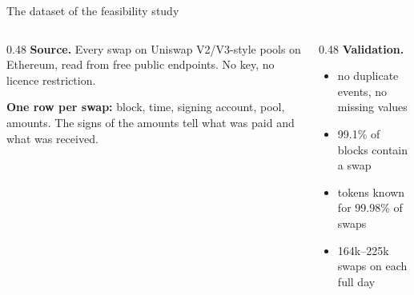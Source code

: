 \documentclass[aspectratio=169,10pt]{beamer}
\begin{document}
\begin{frame}{The dataset of the feasibility study \hfill \done}
  \centering
  \hspace{4pt}
  \hspace{4pt}
  \hspace{4pt}
  \hspace{4pt}
  \vspace{8pt}
  \begin{columns}[T]
    \begin{column}{0.48\textwidth}
      \small
      \textbf{Source.} Every swap on Uniswap V2/V3-style pools on Ethereum, read from free public endpoints. No key, no licence restriction.
      \par\medskip
      \textbf{One row per swap:} block, time, signing account, pool, amounts. The signs of the amounts tell what was paid and what was received.
    \end{column}
    \begin{column}{0.48\textwidth}
      \small
      \textbf{Validation.}
      \begin{itemize}
        \item no duplicate events, no missing values
        \item 99.1\% of blocks contain a swap
        \item tokens known for 99.98\% of swaps
        \item 164k--225k swaps on each full day
      \end{itemize}
    \end{column}
  \end{columns}
\end{frame}
\end{document}

